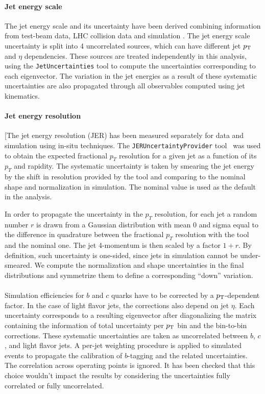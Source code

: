 \paragraph{Jet energy scale}
The jet energy scale and its uncertainty have been derived combining information from test-beam data, 
LHC collision data and simulation \cite{JESwiki}. The jet
energy scale uncertainty is split into 4 uncorrelated sources, 
which can have different jet $p_{{\rm T}}$ and $\eta$ dependencies.  These sources are
treated independently in this analysis, using the \texttt{JetUncertainties} tool \cite{TWiki_JetUncertainties} 
to compute the uncertainties corresponding to each eigenvector. 
The variation in the jet energies as a result of these systematic uncertainties are also propagated through all
observables computed using jet kinematics.

\paragraph{Jet energy resolution}
[The jet energy resolution (JER) has been measured separately for data and simulation 
using in-situ techniques. The \texttt{JERUncertaintyProvider}
tool~\cite{jeruncertaintyprovider} was used to obtain the expected fractional
$p_T$ resolution for a given jet as a function of its $p_T$ and rapidity. 
The systematic uncertainty is taken by smearing the jet energy by the shift 
in resolution provided by the tool and comparing to the nominal
shape and normalization in simulation. 
The nominal value is used as the default in the analysis.

In order to propagate the uncertainty in the $p_T$ resolution, for each jet a 
random number $r$ is drawn from a Gaussian distribution with mean 0 and sigma equal 
 to the difference in quadrature between the fractional $p_T$ resolution with the tool and the nominal
one.  The jet 4-momentum is then scaled by a factor $1+r$.  By definition, such uncertainty
is one-sided, since jets in simulation cannot be under-smeared. 
We compute the normalization and shape uncertainties in the final distributions 
and symmetrize them to define a corresponding ``down'' variation.

\paragraph{\btagging}

Simulation efficiencies for $b$ and $c$ quarks have to be corrected by a
$p_{{\rm T}}$-dependent factor. In the case of light flavor jets, the corrections also 
depend on jet $\eta$. 
Each uncertainty corresponds to a resulting eigenvector after diagonalizing the matrix
containing the information of total uncertainty per $p_{{\rm T}}$ bin and the bin-to-bin 
corrections. These systematic
uncertainties are taken as uncorrelated between $b$, $c$, and light flavor jets.
A per-jet weighting procedure is applied to simulated events to propagate the 
calibration of $b$-tagging and the related uncertainties. 
The correlation across operating points is ignored. It has been checked that this choice
wouldn't impact the results by considering the uncertainties fully correlated or fully uncorrelated.


